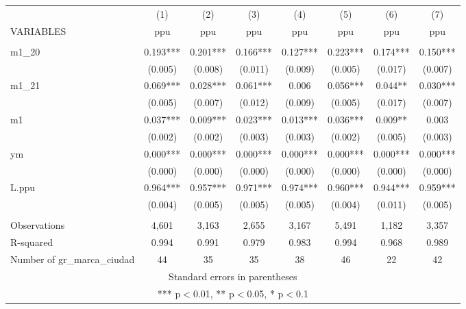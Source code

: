 \begin{tabular}{lccccccc} \hline
 & (1) & (2) & (3) & (4) & (5) & (6) & (7) \\
VARIABLES & ppu & ppu & ppu & ppu & ppu & ppu & ppu \\ \hline
 &  &  &  &  &  &  &  \\
m1\_20 & 0.193*** & 0.201*** & 0.166*** & 0.127*** & 0.223*** & 0.174*** & 0.150*** \\
 & (0.005) & (0.008) & (0.011) & (0.009) & (0.005) & (0.017) & (0.007) \\
m1\_21 & 0.069*** & 0.028*** & 0.061*** & 0.006 & 0.056*** & 0.044** & 0.030*** \\
 & (0.005) & (0.007) & (0.012) & (0.009) & (0.005) & (0.017) & (0.007) \\
m1 & 0.037*** & 0.009*** & 0.023*** & 0.013*** & 0.036*** & 0.009** & 0.003 \\
 & (0.002) & (0.002) & (0.003) & (0.003) & (0.002) & (0.005) & (0.003) \\
ym & 0.000*** & 0.000*** & 0.000*** & 0.000*** & 0.000*** & 0.000*** & 0.000*** \\
 & (0.000) & (0.000) & (0.000) & (0.000) & (0.000) & (0.000) & (0.000) \\
L.ppu & 0.964*** & 0.957*** & 0.971*** & 0.974*** & 0.960*** & 0.944*** & 0.959*** \\
 & (0.004) & (0.005) & (0.005) & (0.005) & (0.004) & (0.011) & (0.005) \\
 &  &  &  &  &  &  &  \\
Observations & 4,601 & 3,163 & 2,655 & 3,167 & 5,491 & 1,182 & 3,357 \\
R-squared & 0.994 & 0.991 & 0.979 & 0.983 & 0.994 & 0.968 & 0.989 \\
 Number of gr\_marca\_ciudad & 44 & 35 & 35 & 38 & 46 & 22 & 42 \\ \hline
\multicolumn{8}{c}{ Standard errors in parentheses} \\
\multicolumn{8}{c}{ *** p$<$0.01, ** p$<$0.05, * p$<$0.1} \\
\end{tabular}
